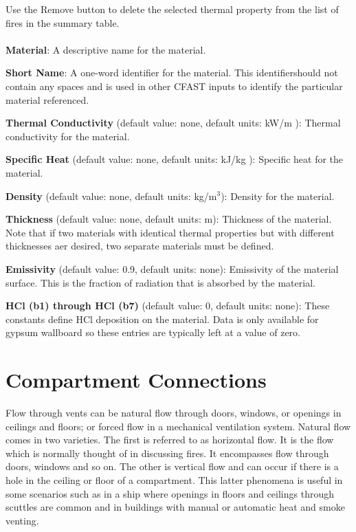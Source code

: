 Use the Remove button to delete the selected thermal property from the list of fires in the summary table. \\~ \\

\textbf{Material}: A descriptive name for the material.

\textbf{Short Name}: A one-word identifier for the material.  This identifiershould not contain any spaces and is used in other CFAST inputs to identify the particular material referenced.

\textbf{Thermal Conductivity} (default value: none, default units: kW/m \degc): Thermal conductivity for the material.

\textbf{Specific Heat} (default value: none, default units: kJ/kg \degc): Specific heat for the material.

\textbf{Density} (default value: none, default units: kg/m$^3$): Density for the material.

\textbf{Thickness} (default value: none, default units: m): Thickness of the material.  Note that if two materials with identical thermal properties but with different thicknesses aer desired, two separate materials must be defined.

\textbf{Emissivity} (default value: 0.9, default units: none): Emissivity of the material surface.  This is the fraction of radiation that is absorbed by the material.

\textbf{HCl (b1) through HCl (b7)} (default value: 0, default units: none): These constants define HCl deposition on the material.  Data is only available for gypsum wallboard so these entries are typically left at a value of zero.

\section{Compartment Connections}

Flow through vents can be natural flow through doors, windows, or openings in ceilings and floors; or forced flow in a mechanical ventilation system.  Natural flow comes in two varieties.  The first is referred to as horizontal flow.  It is the flow which is normally thought of in discussing fires.  It encompasses flow through doors, windows and so on.  The other is vertical flow and can occur if there is a hole in the ceiling or floor of a compartment.  This latter phenomena is useful in some scenarios such as in a ship where openings in floors and ceilings through scuttles are common and in buildings with manual or automatic heat and smoke venting.

